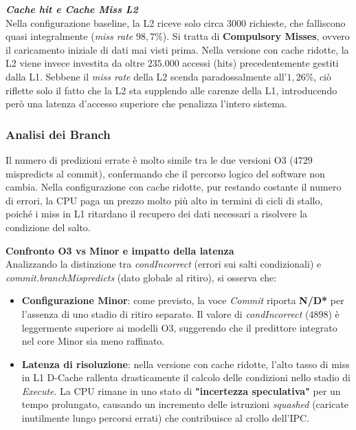 \documentclass[../../main_document/main.tex]{subfiles}
\begin{document}
\vspace{8pt} 
\noindent 
\textbf{\textit{Cache hit e Cache Miss L2}}\\
Nella configurazione baseline, la L2 riceve solo circa $3000$ richieste, che falliscono quasi integralmente (\textit{miss rate} $98,7\%$). Si tratta di \textbf{Compulsory Misses}, ovvero il caricamento iniziale di dati mai visti prima. Nella versione con cache ridotte, la L2 viene invece investita da oltre $235.000$ accessi (hits) precedentemente gestiti dalla L1. Sebbene il \textit{miss rate} della L2 scenda paradossalmente all'$1,26\%$, ciò riflette solo il fatto che la L2 sta supplendo alle carenze della L1, introducendo però una latenza d'accesso superiore che penalizza l'intero sistema.

\subsubsection{Analisi dei Branch}

Il numero di predizioni errate è molto simile tra le due versioni O3 ($4729$ mispredicts al commit), confermando che il percorso logico del software non cambia. Nella configurazione con cache ridotte, pur restando costante il numero di errori, la CPU paga un prezzo molto più alto in termini di cicli di stallo, poiché i miss in L1 ritardano il recupero dei dati necessari a risolvere la condizione del salto.

\vspace{8pt} 
\noindent  
\textbf{Confronto O3 vs Minor e impatto della latenza}\\ Analizzando la distinzione tra \textit{condIncorrect} (errori sui salti condizionali) e \textit{commit.branchMis\-predicts} (dato globale al ritiro), si osserva che: 
\begin{itemize}[leftmargin=1em] 
    \item \textbf{Configurazione Minor}: come previsto, la voce \textit{Commit} riporta \textbf{N/D*} per l'assenza di uno stadio di ritiro separato. Il valore di \textit{condIncorrect} ($4898$) è leggermente superiore ai modelli O3, suggerendo che il predittore integrato nel core Minor sia meno raffinato. 
    \item \textbf{Latenza di risoluzione}: nella versione con cache ridotte, l'alto tasso di miss in L1 D-Cache rallenta drasticamente il calcolo delle condizioni nello stadio di \textit{Execute}. La CPU rimane in uno stato di \textbf{"incertezza speculativa"} per un tempo prolungato, causando un incremento delle istruzioni \textit{squashed} (caricate inutilmente lungo percorsi errati) che contribuisce al crollo dell'IPC. 
\end{itemize}
\end{document}
